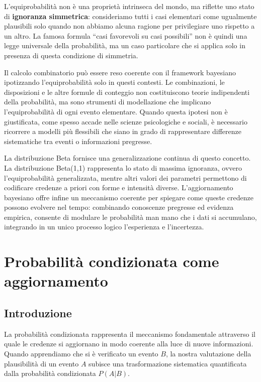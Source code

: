 \documentclass[
  letterpaper,
  DIV=11,
  numbers=noendperiod,
  oneside]{scrreprt}
\theoremstyle{definition}
\theoremstyle{plain}
\theoremstyle{definition}
\theoremstyle{remark}
\begin{document}

L'equiprobabilità non è una proprietà intrinseca del mondo, ma riflette
uno stato di \textbf{ignoranza simmetrica}: consideriamo tutti i casi
elementari come ugualmente plausibili solo quando non abbiamo alcuna
ragione per privilegiare uno rispetto a un altro. La famosa formula
``casi favorevoli su casi possibili'' non è quindi una legge universale
della probabilità, ma un caso particolare che si applica solo in
presenza di questa condizione di simmetria.

Il calcolo combinatorio può essere reso coerente con il framework
bayesiano ipotizzando l'equiprobabilità solo in questi contesti. Le
combinazioni, le disposizioni e le altre formule di conteggio non
costituiscono teorie indipendenti della probabilità, ma sono strumenti
di modellazione che implicano l'equiprobabilità di ogni evento
elementare. Quando questa ipotesi non è giustificata, come spesso accade
nelle scienze psicologiche e sociali, è necessario ricorrere a modelli
più flessibili che siano in grado di rappresentare differenze
sistematiche tra eventi o informazioni pregresse.

La distribuzione Beta fornisce una generalizzazione continua di questo
concetto. La distribuzione Beta(1,1) rappresenta lo stato di massima
ignoranza, ovvero l'equiprobabilità generalizzata, mentre altri valori
dei parametri permettono di codificare credenze a priori con forme e
intensità diverse. L'aggiornamento bayesiano offre infine un meccanismo
coerente per spiegare come queste credenze possono evolvere nel tempo:
combinando conoscenze pregresse ed evidenza empirica, consente di
modulare le probabilità man mano che i dati si accumulano, integrando in
un unico processo logico l'esperienza e l'incertezza.

\chapter{Probabilità condizionata come
aggiornamento}\label{sec-prob-conditional-prob}

\section*{Introduzione}\label{introduzione-4}


La probabilità condizionata rappresenta il meccanismo fondamentale
attraverso il quale le credenze si aggiornano in modo coerente alla luce
di nuove informazioni. Quando apprendiamo che si è verificato un evento
\(B\), la nostra valutazione della plausibilità di un evento \(A\)
subisce una trasformazione sistematica quantificata dalla probabilità
condizionata \(P(A|B)\).
\end{document}
